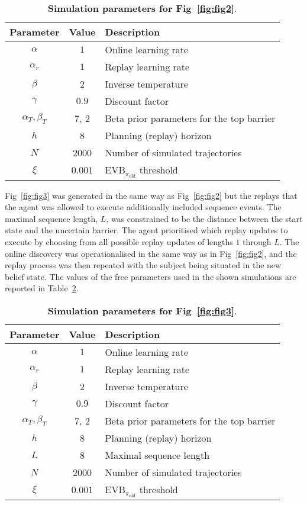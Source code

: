 \begin{table}[h!]
    \centering
    \begin{tabular}{c|c|l}
         Parameter & Value & Description \\ \hline
         $\alpha$ & $1$ & Online learning rate \\
         $\alpha_r$ & $1$ & Replay learning rate \\
         $\beta$ & 2 & Inverse temperature \\
         $\gamma$ & $0.9$ & Discount factor \\
         $\alpha_T, \beta_T$ & 7, 2 & Beta prior parameters for the top barrier \\
         $h$ & 8 & Planning (replay) horizon \\
         $N$ & 2000 & Number of simulated trajectories \\ 
         $\xi$ & $0.001$ & $\text{EVB}_{\pi_{\text{old}}}$ threshold \\
    \end{tabular}
    \caption{\textbf{Simulation parameters for Fig~\ref{fig:fig2}}.}
    \label{tbl:tbl2}
\end{table}

Fig~\ref{fig:fig3} was generated in the same way as Fig~\ref{fig:fig2} but the replays that the agent was allowed to execute additionally included sequence events. The maximal sequence length, $L$, was constrained to be the distance between the start state and the uncertain barrier. The agent prioritised which replay updates to execute by choosing from all possible replay updates of lengths $1$ through $L$. The online discovery was operationalised in the same way as in Fig~\ref{fig:fig2}, and the replay process was then repeated with the subject being situated in the new belief state. The values of the free parameters used in the shown simulations are reported in Table~\ref{tbl:tbl3}.

\begin{table}[h!]
    \centering
    \begin{tabular}{c|c|l}
         Parameter & Value & Description \\ \hline
         $\alpha$ & $1$ & Online learning rate \\
         $\alpha_r$ & $1$ & Replay learning rate \\
         $\beta$ & 2 & Inverse temperature \\
         $\gamma$ & $0.9$ & Discount factor \\
         $\alpha_T, \beta_T$ & 7, 2 & Beta prior parameters for the top barrier \\
         $h$ & 8 & Planning (replay) horizon \\
         $L$ & 8 & Maximal sequence length \\
         $N$ & 2000 & Number of simulated trajectories \\ 
         $\xi$ & $0.001$ & $\text{EVB}_{\pi_{\text{old}}}$ threshold \\
    \end{tabular}
    \caption{\textbf{Simulation parameters for Fig~\ref{fig:fig3}}.}
    \label{tbl:tbl3}
\end{table}


